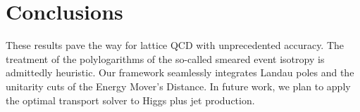\section{Conclusions}\label{sec:conclusions}

These results pave the way for lattice QCD with unprecedented accuracy.
The treatment of the polylogarithms of the so-called smeared event
isotropy is admittedly heuristic. Our framework seamlessly integrates
Landau poles and the unitarity cuts of the Energy Mover's Distance. In
future work, we plan to apply the optimal transport solver to Higgs plus
jet production.

